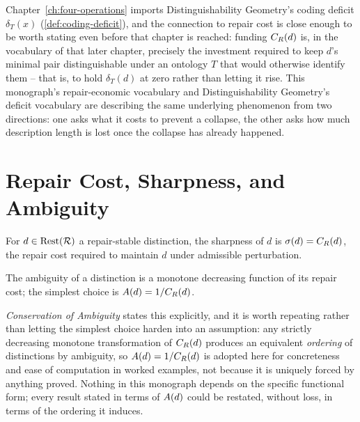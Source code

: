 \begin{remark}
\label{rem:repair-cost-as-deficit}
Chapter~\ref{ch:four-operations} imports Distinguishability Geometry's
coding deficit $\delta_T(x)$ (\cref{def:coding-deficit}), and the connection
to repair cost is close enough to be worth stating even before that chapter
is reached: funding $C_R(d)$ is, in the vocabulary of that later
chapter, precisely the investment required to keep $d$'s minimal pair
distinguishable under an ontology $T$ that would otherwise identify them --
that is, to hold $\delta_T(d)$ at zero rather than letting it rise. This
monograph's repair-economic vocabulary and Distinguishability Geometry's
deficit vocabulary are describing the same underlying phenomenon from two
directions: one asks what it costs to prevent a collapse, the other asks
how much description length is lost once the collapse has already
happened.
\end{remark}

\section{Repair Cost, Sharpness, and Ambiguity}


\begin{definition}
\label{def:sharpness}
For $d \in \mathrm{Rest}(\mathcal{R})$ a repair-stable distinction, the sharpness of $d$
is $\sigma(d) = C_R(d)$, the repair cost required to maintain $d$
under admissible perturbation.
\end{definition}

\begin{definition}
\label{def:ambiguity}
The ambiguity of a distinction is a monotone decreasing function of its
repair cost; the simplest choice is $A(d) = 1/C_R(d)$.
\end{definition}

\begin{remark}
\label{rem:ambiguity-convention}
\emph{Conservation of Ambiguity} states this explicitly, and it is worth
repeating rather than letting the simplest choice harden into an
assumption: any strictly decreasing monotone transformation of
$C_R(d)$ produces an equivalent \emph{ordering} of distinctions by
ambiguity, so $A(d) = 1/C_R(d)$ is adopted here for concreteness
and ease of computation in worked examples, not because it is uniquely
forced by anything proved. Nothing in this monograph depends on the
specific functional form; every result stated in terms of $A(d)$ could
be restated, without loss, in terms of the ordering it induces.
\end{remark}


